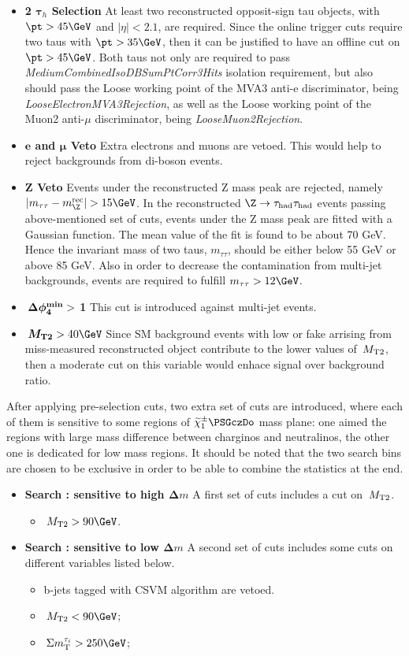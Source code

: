 \begin{itemize}
\item \textbf{2 $\boldsymbol\tau_h$ Selection} At least two reconstructed opposit-sign tau objects, 
with $\pt>45\GeV$ and $|\eta|<2.1$, are required. Since the online trigger cuts require two taus with 
$\pt>35\GeV$, then it can be justified to have an offline cut on $\pt>45\GeV$. 
Both taus not only are required to pass \emph{MediumCombinedIsoDBSumPtCorr3Hits} isolation requirement, 
but also should pass the Loose working point of the MVA3 anti-e discriminator, being \emph{LooseElectronMVA3Rejection}, 
as well as the Loose working point of the Muon2 anti-$\mu$ discriminator, being \emph{LooseMuon2Rejection}.
\item \textbf{$\boldsymbol e$ and $\boldsymbol\mu$ Veto} Extra electrons and muons are vetoed. This would help to reject backgrounds from di-boson events.
\item \textbf{Z Veto} Events under the reconstructed Z mass peak are rejected, namely $|m_{\tau\tau}-m_{\Z}^{\rm rec}|>15\GeV$. 
In the reconstructed $\Z\rightarrow \Tau\Tau$ events passing above-mentioned set of cuts, events under the Z mass peak are fitted 
with a Gaussian function. The mean value of the fit is found to be about 70 GeV. Hence the invariant mass of two taus, $m_{\tau\tau}$, should be 
either below 55 GeV or above 85 GeV. Also in order to decrease the contamination from multi-jet backgrounds, events are required to fulfill $m_{\tau\tau} > 12\GeV$. 
\item \textbf{$\boldsymbol{\,{\Delta\phi_{4}^{\rm min}}} > $ 1} This cut is introduced against multi-jet events.  
\item \textbf{$\boldsymbol\mttwo>40\GeV$} Since SM background events with low \MET or fake \MET arrising from miss-measured reconstructed object
 contribute to the lower values of $\,{M_{\rm T2}}$, then a moderate cut on this variable would enhace signal over background ratio.  
\end{itemize}
After applying pre-selection cuts, two extra set of cuts are introduced, where each of them is sensitive to some regions of $\chione\PSGczDo$ mass plane: one aimed the regions with large mass difference between charginos and neutralinos, the other one is dedicated for low mass regions. It should be noted that the two search bins are chosen to be exclusive in order to be able to combine the statistics at the end.
\begin{itemize}
\item \textbf{Search \binone: sensitive to high $\boldsymbol\Delta m$}
A first set of cuts includes a cut on $\,{M_{\rm T2}}$.
\begin{itemize}
\item $\mttwo>90\GeV$.
\end{itemize}
\item \textbf{Search \bintwo: sensitive to low $\boldsymbol\Delta m$}
A second set of cuts includes some cuts on different variables listed below.
\begin{itemize}
\item b-jets tagged with CSVM algorithm are vetoed.
\item $\mttwo<90\GeV$;
\item $\SumMT>250\GeV$;
\end{itemize}
\end{itemize}
